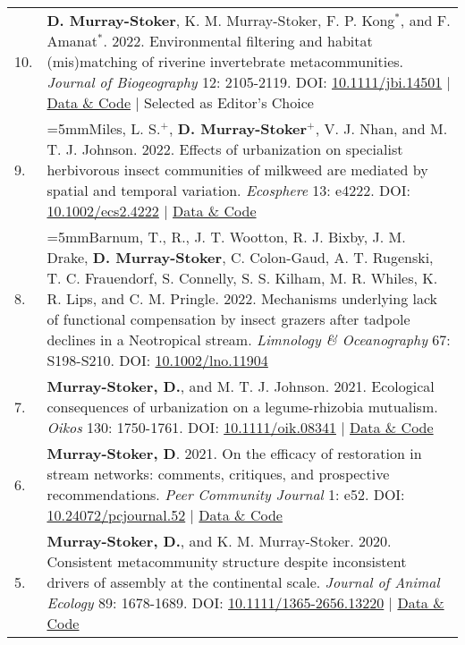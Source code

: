\documentclass[letterpaper,11pt,oneside]{article}
\begin{document}
\def\arraystretch{1.4}
\noindent
\begin{longtable}{@{} p{0.5cm} >{\raggedright\arraybackslash}p{16.7cm}}
10. & \hangindent=5mm\textbf{D. Murray-Stoker}, K. M. Murray-Stoker, F. P. Kong$^{*}$, and F. Amanat$^{*}$. 2022. Environmental filtering and habitat (mis)matching of riverine invertebrate metacommunities. \textit{Journal of Biogeography} 12: 2105-2119. DOI: {\href{http://onlinelibrary.wiley.com/doi/abs/10.1111/jbi.14501}{10.1111/jbi.14501}} | {\href{https://zenodo.org/record/6800554#.Ys9CNOzML0o}{Data \& Code}} | Selected as Editor's Choice \\
9. & \hangindent=5mmMiles, L. S.$^{+}$, \textbf{D. Murray-Stoker}$^{+}$, V. J. Nhan, and M. T. J. Johnson. 2022. Effects of urbanization on specialist herbivorous insect communities of milkweed are mediated by spatial and temporal variation. \textit{Ecosphere} 13: e4222. DOI: {\href{http://onlinelibrary.wiley.com/doi/abs/10.1002/ecs2.4222}{10.1002/ecs2.4222}} | {\href{https://zenodo.org/record/6474064#.Ys9CEezML0o}{Data \& Code}} \\
8. & \hangindent=5mmBarnum, T., R., J. T. Wootton, R. J. Bixby, J. M. Drake, \textbf{D. Murray-Stoker}, C. Colon-Gaud, A. T. Rugenski, T. C. Frauendorf, S. Connelly, S. S. Kilham, M. R. Whiles, K. R. Lips, and C. M. Pringle. 2022. Mechanisms underlying lack of functional compensation by insect grazers after tadpole declines in a Neotropical stream. \textit{Limnology \& Oceanography} 67: S198-S210. DOI: {\href{https://aslopubs.onlinelibrary.wiley.com/doi/full/10.1002/lno.11904}{10.1002/lno.11904}} \\
7. & \hangindent=5mm\textbf{Murray-Stoker, D.}, and M. T. J. Johnson. 2021. Ecological consequences of urbanization on a legume-rhizobia mutualism. \textit{Oikos} 130: 1750-1761. DOI: {\href{https://onlinelibrary.wiley.com/doi/full/10.1111/oik.08341}{10.1111/oik.08341}} | {\href{https://zenodo.org/record/4459724#.YmVqvfPMIbl}{Data \& Code}} \\
6. & \hangindent=5mm\textbf{Murray-Stoker, D}. 2021. On the efficacy of restoration in stream networks: comments, critiques, and prospective recommendations. \textit{Peer Community Journal} 1: e52. DOI: {\href{https://peercommunityjournal.org/articles/10.24072/pcjournal.52/}{10.24072/pcjournal.52}} | {\href{https://doi.org/10.6084/m9.figshare.6448010.v7}{Data \& Code}} \\
5. & \hangindent=5mm\textbf{Murray-Stoker, D.}, and K. M. Murray-Stoker. 2020. Consistent metacommunity structure despite inconsistent drivers of assembly at the continental scale. \textit{Journal of Animal Ecology} 89: 1678-1689. DOI: {\href{http://besjournals.onlinelibrary.wiley.com/doi/abs/10.1111/1365-2656.13220}{10.1111/1365-2656.13220}} | {\href{https://osf.io/62je8/}{Data \& Code}} \\

\end{longtable}
\end{document}
